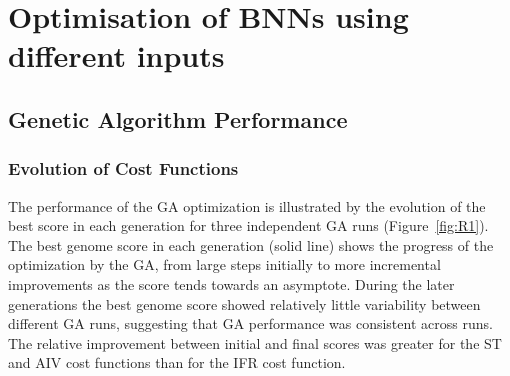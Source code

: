 \section{Optimisation of BNNs using different  inputs}\label{sec:ResultDiffAN}






\subsection{Genetic Algorithm Performance}


\subsubsection{Evolution of Cost Functions}

The performance of the GA optimization is illustrated by the evolution of the
best score in each generation for three independent GA runs
(Figure~\ref{fig:R1}). The best genome score in each generation (solid line)
shows the progress of the optimization by the GA, from large steps initially to
more incremental improvements as the score tends towards an asymptote.  During
the later generations the best genome score showed relatively little variability
between different GA runs, suggesting that GA performance was consistent across
runs. The relative improvement between initial and final scores was greater for
the ST and AIV cost functions than for the IFR cost function.

